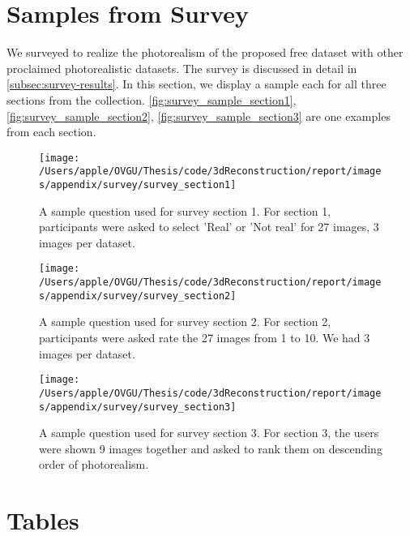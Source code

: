 \clearpage
\newpage
\section{Samples from Survey}\label{sec:samples-from-survey}
We surveyed to realize the photorealism of the proposed \gls{free} dataset with other proclaimed photorealistic datasets.
The survey is discussed in detail in \autoref{subsec:survey-results}.
In this section, we display a sample each for all three sections from the collection.
\autoref{fig:survey_sample_section1}, \autoref{fig:survey_sample_section2}, \autoref{fig:survey_sample_section3} are one examples from each section.

\begin{figure}[ht]
    \centering
    \texttt{[image: /Users/apple/OVGU/Thesis/code/3dReconstruction/report/images/appendix/survey/survey\_section1]}
    \caption{A sample question used for survey section 1. For section 1, participants were asked to select 'Real' or 'Not real' for 27 images, 3 images per dataset.}
    \label{fig:survey_sample_section1}
\end{figure}

\begin{figure}[ht]
    \centering
    \texttt{[image: /Users/apple/OVGU/Thesis/code/3dReconstruction/report/images/appendix/survey/survey\_section2]}
    \caption{A sample question used for survey section 2. For section 2, participants were asked rate the 27 images from 1 to 10. We had 3 images per dataset.}
    \label{fig:survey_sample_section2}
\end{figure}

\begin{figure}[ht]
    \centering
    \texttt{[image: /Users/apple/OVGU/Thesis/code/3dReconstruction/report/images/appendix/survey/survey\_section3]}
    \caption{A sample question used for survey section 3. For section 3, the users were shown 9 images together and asked to rank them on descending order of photorealism. }
    \label{fig:survey_sample_section3}
\end{figure}


\clearpage

\section{Tables}\label{sec:tables}

